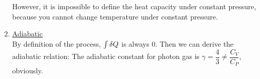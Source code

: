 \documentclass[class=article, crop=false, 12pt]{standalone}
\begin{document}
\begin{example}
\begin{enumerate}
        However, it is impossible to define the heat capacity under constant pressure, 
        because you cannot change temperature under constant pressure.

        \item \ul{Adiabatic}\\
        By definition of the process, $\int \var{Q}$ is always $0$.
        Then we can derive the adiabatic relation:
        The adiabatic constant for photon gas is $\gamma =\dfrac{4}{3} \neq \dfrac{C_V}{C_P}$, obviously.

    \end{enumerate}

\end{example}
\end{document}
